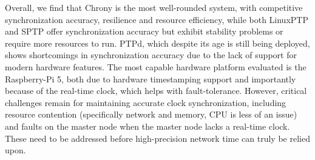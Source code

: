 Overall, we find that Chrony is the most well-rounded system, with competitive
synchronization accuracy, resilience and resource efficiency, while both
LinuxPTP and SPTP offer synchronization accuracy but exhibit stability problems
or require more resources to run. PTPd, which despite its age is still being
deployed, shows shortcomings in synchronization accuracy due to the lack of
support for modern hardware features. The most capable hardware platform
evaluated is the Raspberry-Pi 5, both due to hardware timestamping support and
importantly because of the real-time clock, which helps with fault-tolerance.
However, critical challenges remain for maintaining accurate clock synchronization,
including resource contention (specifically network and memory, CPU is less of an
issue) and faults on the master node when the master node lacks a real-time
clock. These need to be addressed before
high-precision network time can truly be relied upon.



%

